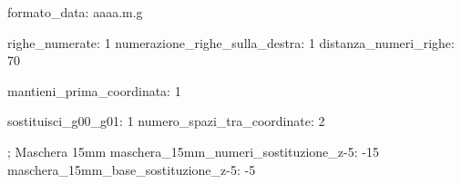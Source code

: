 formato_data: aaaa.m.g

righe_numerate:                 1
numerazione_righe_sulla_destra: 1
distanza_numeri_righe:          70

mantieni_prima_coordinata:      1

sostituisci_g00_g01:         1
numero_spazi_tra_coordinate: 2

; Maschera 15mm
maschera_15mm_numeri_sostituzione_z-5: -15
maschera_15mm_base_sostituzione_z-5: -5